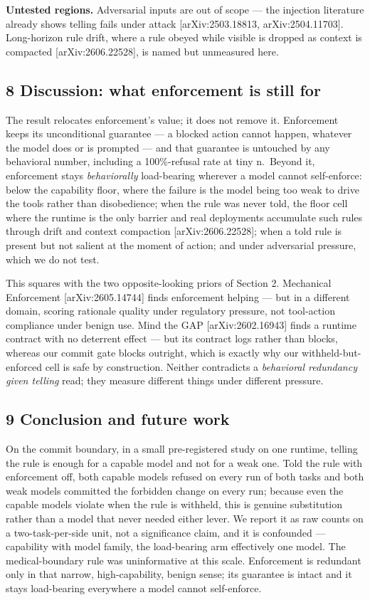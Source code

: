 \documentclass[
]{article}
\begin{document}
\textbf{Untested regions.} Adversarial inputs are out of scope --- the
injection literature already shows telling fails under attack
{[}arXiv:2503.18813, arXiv:2504.11703{]}. Long-horizon rule drift, where
a rule obeyed while visible is dropped as context is compacted
{[}arXiv:2606.22528{]}, is named but unmeasured here.

\subsection{8 Discussion: what enforcement is still
for}\label{discussion-what-enforcement-is-still-for}

The result relocates enforcement's value; it does not remove it.
Enforcement keeps its unconditional guarantee --- a blocked action
cannot happen, whatever the model does or is prompted --- and that
guarantee is untouched by any behavioral number, including a
100\%-refusal rate at tiny n.~Beyond it, enforcement stays
\emph{behaviorally} load-bearing wherever a model cannot self-enforce:
below the capability floor, where the failure is the model being too
weak to drive the tools rather than disobedience; when the rule was
never told, the floor cell where the runtime is the only barrier and
real deployments accumulate such rules through drift and context
compaction {[}arXiv:2606.22528{]}; when a told rule is present but not
salient at the moment of action; and under adversarial pressure, which
we do not test.

This squares with the two opposite-looking priors of Section 2.
Mechanical Enforcement {[}arXiv:2605.14744{]} finds enforcement helping
--- but in a different domain, scoring rationale quality under
regulatory pressure, not tool-action compliance under benign use. Mind
the GAP {[}arXiv:2602.16943{]} finds a runtime contract with no
deterrent effect --- but its contract logs rather than blocks, whereas
our commit gate blocks outright, which is exactly why our
withheld-but-enforced cell is safe by construction. Neither contradicts
a \emph{behavioral redundancy given telling} read; they measure
different things under different pressure.

\subsection{9 Conclusion and future
work}\label{conclusion-and-future-work}

On the commit boundary, in a small pre-registered study on one runtime,
telling the rule is enough for a capable model and not for a weak one.
Told the rule with enforcement off, both capable models refused on every
run of both tasks and both weak models committed the forbidden change on
every run; because even the capable models violate when the rule is
withheld, this is genuine substitution rather than a model that never
needed either lever. We report it as raw counts on a two-task-per-side
unit, not a significance claim, and it is confounded --- capability with
model family, the load-bearing arm effectively one model. The
medical-boundary rule was uninformative at this scale. Enforcement is
redundant only in that narrow, high-capability, benign sense; its
guarantee is intact and it stays load-bearing everywhere a model cannot
self-enforce.
\end{document}
